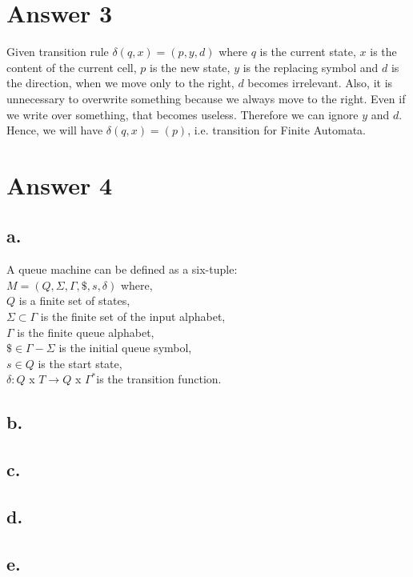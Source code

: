 \documentclass[12pt]{article}
\begin{document}
\section*{Answer 3}

Given transition rule $\delta(q,x) = (p,y,d)$ where $q$ is the current state, $x$ is the content of the current cell, $p$ is the new state, $y$ is the replacing symbol and $d$ is the direction, when we move only to the right, $d$ becomes irrelevant. Also, it is unnecessary to overwrite something because we always move to the right. Even if we write over something, that becomes useless. Therefore we can ignore $y$ and $d$. Hence, we will have $\delta(q,x) = (p)$, i.e. transition for Finite Automata.

\section*{Answer 4}

\subsection*{a.}
A queue machine can be defined as a six-tuple:\\
$M = (Q,\Sigma,\Gamma,\$, s, \delta)$ where,
\\
$Q$ is a finite set of states,\\
$\Sigma \subset \Gamma$ is the finite set of the input alphabet,\\
$\Gamma$ is the finite queue alphabet,\\
$\$ \in \Gamma - \Sigma $ is the initial queue symbol,\\
$s \in Q$ is the start state,\\
$\delta: Q$ x $T \rightarrow Q$ x $\Gamma^*$is the transition function.\\

\subsection*{b.}

\subsection*{c.}

\subsection*{d.}

\subsection*{e.}
\end{document}

